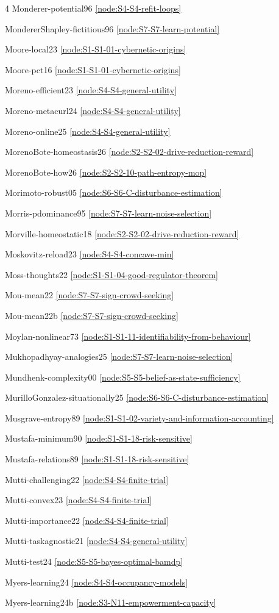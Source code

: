 \documentclass[10pt]{article}
\begin{document}
{\begin{multicols}{4}
Monderer-potential96 \hfill \ref{node:S4-S4-refit-loops}\par
MondererShapley-fictitious96 \hfill \ref{node:S7-S7-learn-potential}\par
Moore-local23 \hfill \ref{node:S1-S1-01-cybernetic-origins}\par
Moore-pct16 \hfill \ref{node:S1-S1-01-cybernetic-origins}\par
Moreno-efficient23 \hfill \ref{node:S4-S4-general-utility}\par
Moreno-metacurl24 \hfill \ref{node:S4-S4-general-utility}\par
Moreno-online25 \hfill \ref{node:S4-S4-general-utility}\par
MorenoBote-homeostasis26 \hfill \ref{node:S2-S2-02-drive-reduction-reward}\par
MorenoBote-how26 \hfill \ref{node:S2-S2-10-path-entropy-mop}\par
Morimoto-robust05 \hfill \ref{node:S6-S6-C-disturbance-estimation}\par
Morris-pdominance95 \hfill \ref{node:S7-S7-learn-noise-selection}\par
Morville-homeostatic18 \hfill \ref{node:S2-S2-02-drive-reduction-reward}\par
Moskovitz-reload23 \hfill \ref{node:S4-S4-concave-min}\par
Moss-thoughts22 \hfill \ref{node:S1-S1-04-good-regulator-theorem}\par
Mou-mean22 \hfill \ref{node:S7-S7-sign-crowd-seeking}\par
Mou-mean22b \hfill \ref{node:S7-S7-sign-crowd-seeking}\par
Moylan-nonlinear73 \hfill \ref{node:S1-S1-11-identifiability-from-behaviour}\par
Mukhopadhyay-analogies25 \hfill \ref{node:S7-S7-learn-noise-selection}\par
Mundhenk-complexity00 \hfill \ref{node:S5-S5-belief-as-state-sufficiency}\par
MurilloGonzalez-situationally25 \hfill \ref{node:S6-S6-C-disturbance-estimation}\par
Musgrave-entropy89 \hfill \ref{node:S1-S1-02-variety-and-information-accounting}\par
Mustafa-minimum90 \hfill \ref{node:S1-S1-18-risk-sensitive}\par
Mustafa-relations89 \hfill \ref{node:S1-S1-18-risk-sensitive}\par
Mutti-challenging22 \hfill \ref{node:S4-S4-finite-trial}\par
Mutti-convex23 \hfill \ref{node:S4-S4-finite-trial}\par
Mutti-importance22 \hfill \ref{node:S4-S4-finite-trial}\par
Mutti-taskagnostic21 \hfill \ref{node:S4-S4-general-utility}\par
Mutti-test24 \hfill \ref{node:S5-S5-bayes-optimal-bamdp}\par
Myers-learning24 \hfill \ref{node:S4-S4-occupancy-models}\par
Myers-learning24b \hfill \ref{node:S3-N11-empowerment-capacity}\par


\end{multicols}}
\end{document}
